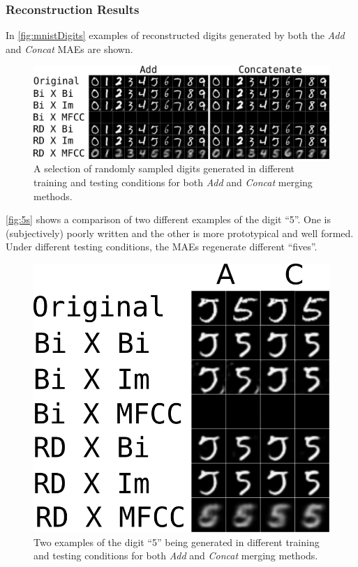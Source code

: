 \subsubsection{Reconstruction Results}

In \autoref{fig:mnistDigits} examples of reconstructed digits generated by both the \textit{Add} and \textit{Concat} MAEs are shown.

\begin{figure}[h]
\begin{center}
	\includegraphics[width=\textwidth]{Figs/mnistSpoken/lbAll.png}
	\caption{A selection of randomly sampled digits generated in different training and testing conditions for both \textit{Add} and \textit{Concat} merging methods.}
	\label{fig:mnistDigits}
\end{center}
\end{figure}

\autoref{fig:5s} shows a comparison of two different examples of the digit ``5''. One is (subjectively) poorly written and the other is more prototypical and well formed. Under different testing conditions, the MAEs regenerate different ``fives''.

\begin{figure}[h]
\begin{center}
	\includegraphics{Figs/mnistSpoken/5s.png}
	\caption{Two examples of the digit ``5'' being generated in different training and testing conditions for both \textit{Add} and \textit{Concat} merging methods.}
	\label{fig:5s}
\end{center}
\end{figure}



